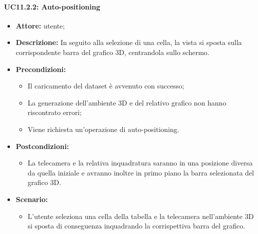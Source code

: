 \paragraph{UC11.2.2: Auto-positioning}
\begin{itemize}    
    \item \textbf{Attore:} utente;
    \item \textbf{Descrizione:} In seguito alla selezione di una cella, la vista si sposta sulla corrispondente barra del grafico 3D, centrandola sullo schermo.
    \item \textbf{Precondizioni:}    
        \begin{itemize}
            \item Il caricamento del dataset è avvenuto con successo;
            \item La generazione dell'ambiente 3D e del relativo grafico non hanno riscontrato errori;
            \item Viene richiesta un'operazione di auto-positioning.
        \end{itemize}    
    \item \textbf{Postcondizioni:}
        \begin{itemize}
            \item La telecamera e la relativa inquadratura saranno in una posizione diversa da quella iniziale e avranno inoltre in primo piano la barra selezionata del grafico 3D.
        \end{itemize}    
    \item \textbf{Scenario:} 
        \begin{itemize}
            \item L'utente seleziona una cella della tabella e la telecamera nell'ambiente 3D si sposta di conseguenza inquadrando la corrispettiva barra del grafico.
        \end{itemize}
\end{itemize}

